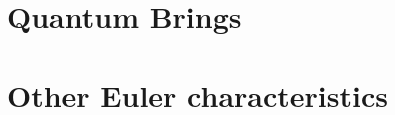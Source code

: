 
\section{Quantum Brings}
\label{sec:quantum-brings}



\section{Other Euler characteristics}
\label{sec:other-euler}

